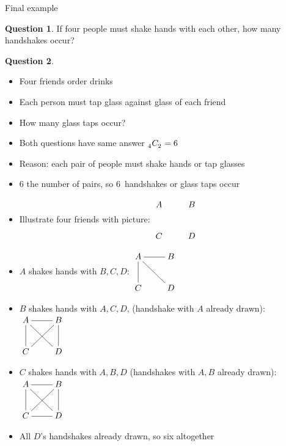 \documentclass{beamer}
\theoremstyle{definition}
\newtheorem{question}{Question}
\newcommand\ncr[2]{\tensor[_{#1}]C{_{#2}}}
\begin{document}
\begin{frame}{Final example}
\begin{question}
If four people must shake hands with each other,
how many handshakes occur?
\end{question}
\begin{question}
\begin{itemize}
\item Four friends order drinks
\item Each person must tap glass against glass of each friend
\item How many glass taps occur?
\end{itemize}
\end{question}
\begin{itemize}
\item Both questions have same answer $\ncr{4}{2}=6$
\item Reason: each pair of people must shake hands or tap glasses
\item $6$ the number of pairs, so $6$~handshakes or glass taps occur
\end{itemize}
\end{frame}

\begin{frame}
\begin{itemize}
\item Illustrate four friends with picture:
$\vcenter{\begin{xy}\xymatrix{
A&B\\C&D}\end{xy}}$
\item $A$ shakes hands with $B,C,D$:
$\vcenter{\begin{xy}\xymatrix{
A\ar@{-}[r]\ar@{-}[d]\ar@{-}[dr]&B\\
C&D}\end{xy}}$
\item $B$ shakes hands with $A,C,D$,
(handshake with $A$ already drawn):
$\vcenter{\begin{xy}\xymatrix{
A\ar@{-}[r]\ar@{-}[d]\ar@{-}[dr]&B\ar@{-}[dl]\ar@{-}[d]\\
C&D}\end{xy}}$
\item $C$ shakes hands with $A,B,D$ (handshakes with
$A,B$ already drawn):
$\vcenter{\begin{xy}\xymatrix{
A\ar@{-}[r]\ar@{-}[d]\ar@{-}[dr]&B\ar@{-}[dl]\ar@{-}[d]\\
C\ar@{-}[r]&D}\end{xy}}$
\item All $D$'s handshakes already drawn, so six altogether
\end{itemize}
\end{frame}
\end{document}
